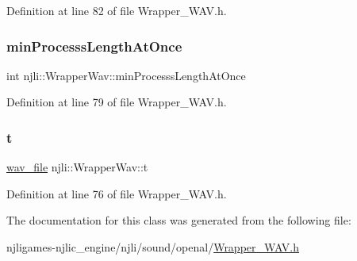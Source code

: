 Definition at line 82 of file Wrapper\+\_\+\+W\+A\+V.\+h.

\mbox{\label{classnjli_1_1_wrapper_wav_a89b4f2b0d96ed110de07c17f395b40b7}} 
\subsubsection{\texorpdfstring{min\+Processs\+Length\+At\+Once}{minProcesssLengthAtOnce}}
{\footnotesize\ttfamily int njli\+::\+Wrapper\+Wav\+::min\+Processs\+Length\+At\+Once\hspace{0.3cm}{\ttfamily [private]}}



Definition at line 79 of file Wrapper\+\_\+\+W\+A\+V.\+h.

\mbox{\label{classnjli_1_1_wrapper_wav_ad32ca04f4229e8b702a427dca72b9957}} 
\subsubsection{\texorpdfstring{t}{t}}
{\footnotesize\ttfamily \mbox{\hyperlink{structwav__file}{wav\+\_\+file}} njli\+::\+Wrapper\+Wav\+::t\hspace{0.3cm}{\ttfamily [private]}}



Definition at line 76 of file Wrapper\+\_\+\+W\+A\+V.\+h.



The documentation for this class was generated from the following file\+:\begin{DoxyCompactItemize}
\item 
njligames-\/njlic\+\_\+engine/njli/sound/openal/\mbox{\hyperlink{_wrapper___w_a_v_8h}{Wrapper\+\_\+\+W\+A\+V.\+h}}\end{DoxyCompactItemize}
